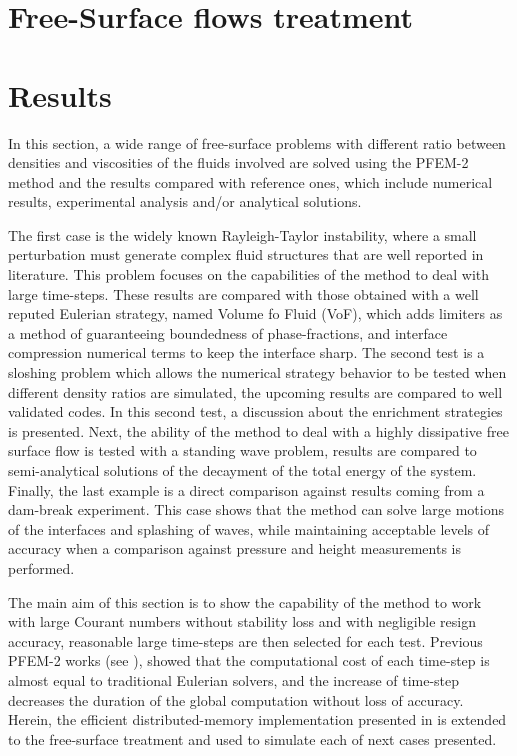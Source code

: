 \documentclass[review]{elsarticle}
\begin{document}
\section[Free-Surface treatment]{Free-Surface flows treatment}\label{Free_surface}



% 

\section{Results}\label{FS_results}

In this section, a wide range of free-surface problems with different ratio between densities and viscosities of the fluids involved are solved using the PFEM-2 method and the results compared with reference ones, which include numerical results, experimental analysis and/or analytical solutions.

The first case is the widely known Rayleigh-Taylor instability, where a small perturbation must generate complex fluid structures that are well reported in literature.
This problem focuses on the capabilities of the method to deal with large time-steps. These results are compared with those obtained with a well reputed Eulerian strategy, named Volume fo Fluid (VoF), which adds limiters as a method of guaranteeing boundedness of phase-fractions, and interface compression numerical terms to keep the interface sharp.
The second test is a sloshing problem which allows the numerical strategy behavior to be tested when different density ratios are simulated, the upcoming results are compared to well validated codes. In this second test, a discussion about the enrichment strategies is presented. Next, the ability of the method to deal with a highly dissipative free surface flow is tested with a standing wave problem, results are compared to semi-analytical solutions of the decayment of the total energy of the system.
Finally, the last example is a direct comparison against results coming from a dam-break experiment.
This case shows that the method can solve large motions of the interfaces and splashing of waves, while maintaining acceptable levels of accuracy when a comparison against pressure and height measurements is performed.

The main aim of this section is to show the capability of the method to work with large Courant numbers without stability loss and with negligible resign accuracy, reasonable large time-steps are then selected for each test. Previous PFEM-2 works (see \cite{Idelsohn12b}\cite{Gimenez14}), showed that the computational cost of each time-step is almost equal to traditional Eulerian solvers, and the increase of time-step decreases the duration of the global computation without loss of accuracy. Herein, the efficient distributed-memory implementation presented in \cite{Gimenez14} is extended to the free-surface treatment and used to simulate each of next cases presented.
\end{document}
